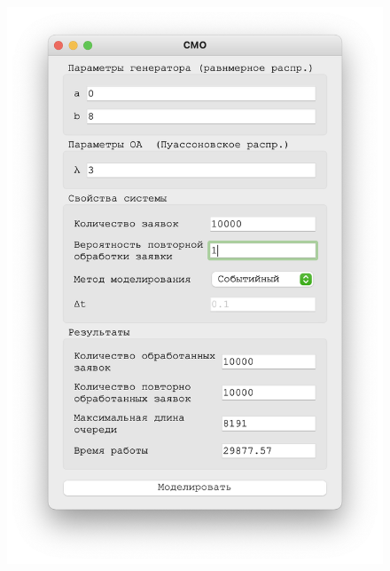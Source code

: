  \begin{figure}[!htb]
    \begin{minipage}{0.55\textwidth}
      \centering
      \includegraphics[width=1\linewidth]{3-1-s}
    \end{minipage}\hfill
    \begin{minipage}{0.55\textwidth}
      \centering

\end{minipage}
\end{figure}
